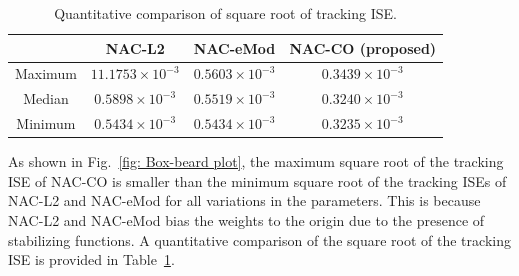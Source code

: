 \documentclass[letterpaper, 10 pt, conference]{ieeeconf}  %
\begin{document}
\begin{table}[!t]
    \renewcommand{\arraystretch}{1.3}
    \caption{Quantitative comparison of square root of tracking ISE.}
    \centering
    \begin{tabular}{c c c c }
    \hline
     & \textbf{NAC-L2}\!&\!\textbf{NAC-eMod}\!&\!\textbf{NAC-CO} (proposed) 
     \\
     \hline
    \hline 
    Maximum\!&\!$11.1753\!\times\!10^{-3}$\!&\!$0.5603\!\times\!10^{-3}$\!&\!$0.3439\!\times\!10^{-3}$\!\\
    \hline
    Median\!&\!$0.5898\!\times\!10^{-3}$\!&\!$0.5519\!\times\!10^{-3}$\!&\!$0.3240\!\times\!10^{-3}$\!\\
    \hline
    Minimum\!&\!$0.5434\!\times\!10^{-3}$\!&\!$0.5434\!\times\!10^{-3}$\!&\!$0.3235\!\times\!10^{-3}$\!\\
    \hline
    \end{tabular}
    \label{table: error norm}
\end{table}

As shown in Fig.~\ref{fig: Box-beard plot}, the maximum square root of the tracking ISE of NAC-CO is smaller than the minimum square root of the tracking ISEs of NAC-L2 and NAC-eMod for all variations in the parameters.
This is because NAC-L2 and NAC-eMod bias the weights to the origin due to the presence of stabilizing functions.
A quantitative comparison of the square root of the tracking ISE is provided in Table~\ref{table: error norm}.
\end{document}
